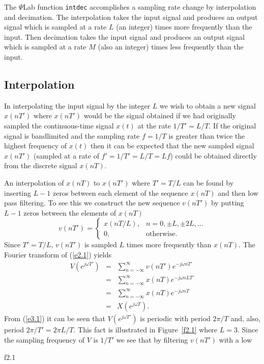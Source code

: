 	The $\Psi$Lab function {\tt intdec} accomplishes
a sampling rate change by interpolation and decimation.
The interpolation takes the input signal and produces an 
output signal which is sampled at a rate $L$ (an integer) times more 
frequently than the input. Then  decimation takes the input signal and 
produces an output signal which 
is sampled at a rate $M$ (also an integer) times less frequently than the 
input.  

\subsection{Interpolation}

	In interpolating the input signal by the integer $L$
we wish to obtain a new signal $x(nT')$ where $x(nT')$ would
be the signal obtained if we had originally 
sampled the continuous-time signal $x(t)$ at the rate $1/T'=L/T$.
If the original signal is bandlimited and the sampling rate 
$f=1/T$ is greater than twice the
highest frequency of $x(t)$ then it can be expected that
the new sampled signal $x(nT')$ (sampled at a rate of
$f'=1/T'=L/T=Lf$) could be obtained directly from the discrete
signal $x(nT)$.

	An interpolation of $x(nT)$ to $x(nT')$ where $T'=T/L$
can be found by inserting $L-1$ zeros between each element of the
sequence $x(nT)$ and then low pass filtering.  To see this we construct
the new sequence $v(nT')$ by putting $L-1$ zeros between the 
elements of $x(nT)$
%
\begin{equation}
v(nT')=\left\{ \begin{array}{ll}
                     x(nT/L), & \mbox{$n=0,\pm L,\pm 2L,\ldots$}\\
                     0, & \mbox{otherwise}.
                \end{array}
       \right.
\label{e2.1}
\end{equation}
%
Since $T'=T/L$, $v(nT')$ is sampled $L$ times more frequently than 
$x(nT)$.  The Fourier transform of (\ref{e2.1}) yields
%
\begin{eqnarray}
V(e^{j\omega T'}) 
         &=& \sum_{n=-\infty}^{\infty}v(nT')e^{-j\omega nT'}\nonumber\\
         &=& \sum_{n=-\infty}^{\infty}x(nT)e^{-j\omega nLT'}\nonumber\\
         &=& \sum_{n=-\infty}^{\infty}x(nT)e^{-j\omega nT}\nonumber\\
                  &=& X(e^{j\omega T}).
\label{e3.1}
\end{eqnarray}
%
From (\ref{e3.1}) it can be seen that $V(e^{j\omega T'})$ is periodic with
period $2\pi/T$ and, also, period $2\pi/T'=2\pi L/T$.  This fact is 
illustrated in Figure~\ref{f2.1} where $L=3$.  Since the sampling frequency of 
$V$ is $1/T'$ we see that by filtering $v(nT')$ with a low
%

{f2.1}

